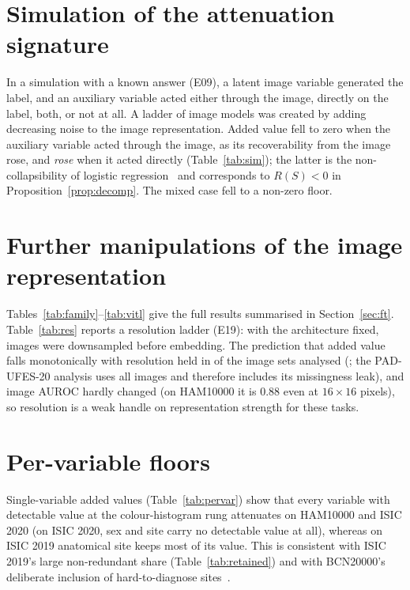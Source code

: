\documentclass[conference]{IEEEtran}
\begin{document}
\section{Simulation of the attenuation signature}\label{app:sim}

In a simulation with a known answer (E09), a latent image variable generated the label, and an auxiliary variable acted either through the image, directly on the label, both, or not at all. A ladder of image models was created by adding decreasing noise to the image representation. Added value fell to zero when the auxiliary variable acted through the image, as its recoverability from the image rose, and \emph{rose} when it acted directly (Table~\ref{tab:sim}); the latter is the non-collapsibility of logistic regression~\cite{gail1984} and corresponds to $R(S)<0$ in Proposition~\ref{prop:decomp}. The mixed case fell to a non-zero floor.

\section{Further manipulations of the image representation}\label{app:strength}




Tables~\ref{tab:family}--\ref{tab:vitl} give the full results summarised in Section~\ref{sec:ft}. Table~\ref{tab:res} reports a resolution ladder (E19): with the architecture fixed, images were downsampled before embedding. The prediction that added value falls monotonically with resolution held in \RESholdsN{} of the \RESn{} image sets analysed (\RESholds{}; the PAD-UFES-20 analysis uses all images and therefore includes its missingness leak), and image AUROC hardly changed (on HAM10000 it is 0.88 even at $16\times16$ pixels), so resolution is a weak handle on representation strength for these tasks.

\section{Per-variable floors}\label{app:pervar}

Single-variable added values (Table~\ref{tab:pervar}) show that every variable with detectable value at the colour-histogram rung attenuates on HAM10000 and ISIC 2020 (on ISIC 2020, sex and site carry no detectable value at all), whereas on ISIC 2019 anatomical site keeps most of its value. This is consistent with ISIC 2019's large non-redundant share (Table~\ref{tab:retained}) and with BCN20000's deliberate inclusion of hard-to-diagnose sites~\cite{combalia2019bcn}.
\end{document}
